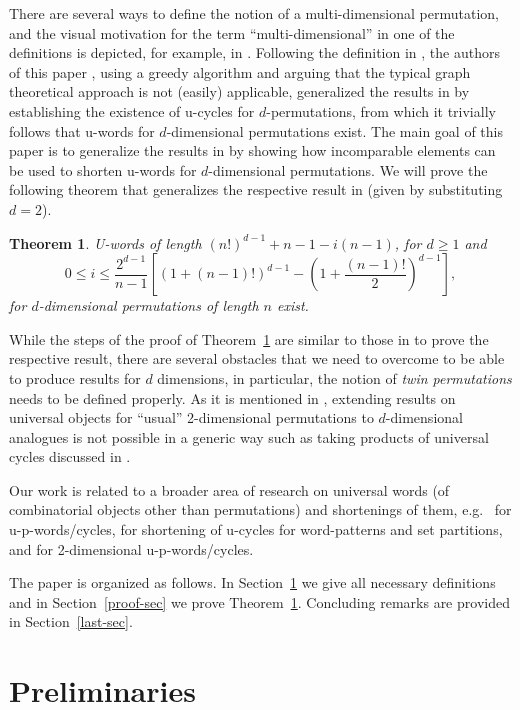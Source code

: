 \documentclass[12pt]{article}
\newtheorem{thm}{Theorem}[section]
\begin{document}
There are several ways to define the notion of a multi-dimensional permutation, and the visual motivation for the term ``multi-dimensional'' in one of the definitions is depicted, for example, in \cite[Fig. 2]{ZG07}. Following the definition in \cite{AKLPT}, the authors of this paper \cite{KQ}, using a greedy algorithm and arguing that the typical graph theoretical approach is not (easily) applicable, generalized the results in \cite{CDG1992,GKSZ,Hurlbert} by establishing the existence of u-cycles for $d$-permutations, from which it trivially follows that u-words for $d$-dimensional permutations exist.  The main goal of this paper is to generalize the results in \cite{KPV} by showing how incomparable elements can be used to shorten u-words for $d$-dimensional permutations. We will prove the following theorem that generalizes the respective result in \cite{KPV} (given by substituting $d=2$).

\begin{thm}\label{main-thm} U-words of length $(n!)^{d-1}+n-1-i(n-1)$, for $d\geq 1$ and 
$$0\leq i\leq \frac{2^{d-1}}{n-1}\left[(1+(n-1)!)^{d-1}-\left(1+\frac{(n-1)!}{2}\right)^{d-1}\right],$$
for $d$-dimensional permutations of length $n$ exist.\end{thm}

While the steps of the proof of Theorem~\ref{main-thm} are similar to those in \cite{KPV} to prove the respective result, there are several obstacles that we need to overcome to be able to produce results for $d$ dimensions, in particular, the notion of {\em twin permutations} needs to be defined properly. As it is mentioned in \cite{KQ}, extending results on universal objects for ``usual'' 2-dimensional permutations to $d$-dimensional analogues is not possible in a generic way such as taking products of universal cycles discussed in \cite{DiaconisGraham}.
 
Our work is related to a broader area of research on universal words (of combinatorial objects other than permutations) and shortenings of them, e.g.\ \cite{CKMS17,GGHKKKS}  for u-p-words/cycles, \cite{CK20} for shortening of u-cycles for word-patterns and set partitions, and \cite{CKKP24} for 2-dimensional u-p-words/cycles. 

The paper is organized as follows. In Section~\ref{prelim-sec} we give all necessary definitions and in Section~\ref{proof-sec} we prove Theorem~\ref{main-thm}. Concluding remarks are provided in Section~\ref{last-sec}. 

\section{Preliminaries}\label{prelim-sec}
\end{document}
